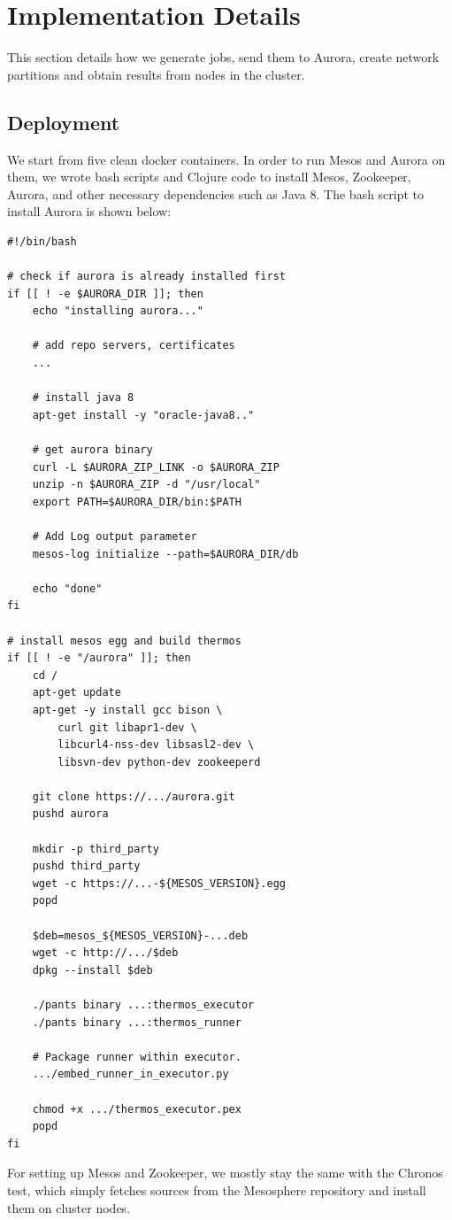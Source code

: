 \documentclass[letterpaper,twocolumn,10pt]{article}
\begin{document}
\section{Implementation Details}
This section details how we generate jobs, send them to Aurora, create network partitions and obtain results from nodes in the cluster.

\subsection{Deployment}
We start from five clean docker containers. In order to run Mesos and Aurora on them, we wrote bash scripts and Clojure code to install Mesos, Zookeeper, Aurora, and other necessary dependencies such as Java 8. The bash script to install Aurora is shown below:

\begin{verbatim}
#!/bin/bash

# check if aurora is already installed first
if [[ ! -e $AURORA_DIR ]]; then
    echo "installing aurora..."
    
    # add repo servers, certificates
    ...
    
    # install java 8
    apt-get install -y "oracle-java8.."

    # get aurora binary
    curl -L $AURORA_ZIP_LINK -o $AURORA_ZIP
    unzip -n $AURORA_ZIP -d "/usr/local"
    export PATH=$AURORA_DIR/bin:$PATH

    # Add Log output parameter
    mesos-log initialize --path=$AURORA_DIR/db

    echo "done"
fi

# install mesos egg and build thermos
if [[ ! -e "/aurora" ]]; then
    cd /
    apt-get update
    apt-get -y install gcc bison \
        curl git libapr1-dev \
        libcurl4-nss-dev libsasl2-dev \
        libsvn-dev python-dev zookeeperd
        
    git clone https://.../aurora.git
    pushd aurora
    
    mkdir -p third_party
    pushd third_party
    wget -c https://...-${MESOS_VERSION}.egg
    popd

    $deb=mesos_${MESOS_VERSION}-...deb
    wget -c http://.../$deb
    dpkg --install $deb
    
    ./pants binary ...:thermos_executor
    ./pants binary ...:thermos_runner
    
    # Package runner within executor.
    .../embed_runner_in_executor.py
    
    chmod +x .../thermos_executor.pex
    popd
fi
\end{verbatim}
For setting up Mesos and Zookeeper, we mostly stay the same with the Chronos test, which simply fetches sources from the Mesosphere repository and install them on cluster nodes.
\end{document}
